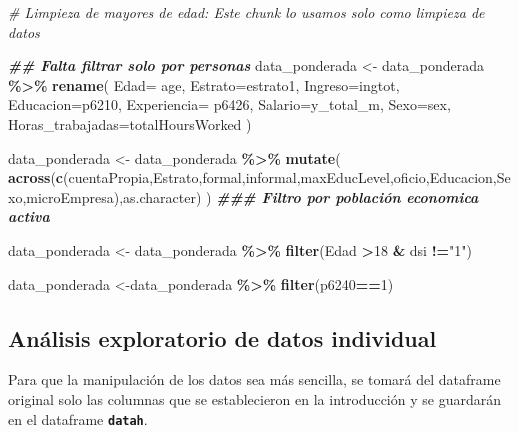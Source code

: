 \documentclass[
]{article}
\newenvironment{Shaded}{\begin{snugshade}}{\end{snugshade}}
\newcommand{\AttributeTok}[1]{\textcolor[rgb]{0.13,0.29,0.53}{#1}}
\newcommand{\CommentTok}[1]{\textcolor[rgb]{0.56,0.35,0.01}{\textit{#1}}}
\newcommand{\DecValTok}[1]{\textcolor[rgb]{0.00,0.00,0.81}{#1}}
\newcommand{\DocumentationTok}[1]{\textcolor[rgb]{0.56,0.35,0.01}{\textbf{\textit{#1}}}}
\newcommand{\FunctionTok}[1]{\textcolor[rgb]{0.13,0.29,0.53}{\textbf{#1}}}
\newcommand{\NormalTok}[1]{#1}
\newcommand{\OtherTok}[1]{\textcolor[rgb]{0.56,0.35,0.01}{#1}}
\newcommand{\SpecialCharTok}[1]{\textcolor[rgb]{0.81,0.36,0.00}{\textbf{#1}}}
\newcommand{\StringTok}[1]{\textcolor[rgb]{0.31,0.60,0.02}{#1}}
\begin{document}
\begin{Shaded}
\begin{Highlighting}[]
\CommentTok{\# Limpieza de mayores de edad: Este chunk lo usamos solo como limpieza de datos }


\DocumentationTok{\#\# Falta filtrar solo por personas }
\NormalTok{data\_ponderada }\OtherTok{\textless{}{-}}\NormalTok{ data\_ponderada }\SpecialCharTok{\%\textgreater{}\%}
    \FunctionTok{rename}\NormalTok{(}
      \AttributeTok{Edad=}\NormalTok{ age,}
      \AttributeTok{Estrato=}\NormalTok{estrato1,}
      \AttributeTok{Ingreso=}\NormalTok{ingtot,}
      \AttributeTok{Educacion=}\NormalTok{p6210,}
      \AttributeTok{Experiencia=}\NormalTok{ p6426,}
      \AttributeTok{Salario=}\NormalTok{y\_total\_m,}
      \AttributeTok{Sexo=}\NormalTok{sex,}
      \AttributeTok{Horas\_trabajadas=}\NormalTok{totalHoursWorked}
\NormalTok{  )  }

\NormalTok{data\_ponderada }\OtherTok{\textless{}{-}}\NormalTok{ data\_ponderada }\SpecialCharTok{\%\textgreater{}\%}
    \FunctionTok{mutate}\NormalTok{(}
      \FunctionTok{across}\NormalTok{(}\FunctionTok{c}\NormalTok{(cuentaPropia,Estrato,formal,informal,maxEducLevel,oficio,Educacion,Sexo,microEmpresa),as.character) }
\NormalTok{  )}
\DocumentationTok{\#\#\# Filtro por población economica activa}

\NormalTok{data\_ponderada }\OtherTok{\textless{}{-}}\NormalTok{ data\_ponderada }\SpecialCharTok{\%\textgreater{}\%}
  \FunctionTok{filter}\NormalTok{(Edad }\SpecialCharTok{\textgreater{}}\DecValTok{18} \SpecialCharTok{\&}\NormalTok{ dsi }\SpecialCharTok{!=}\StringTok{"1"}\NormalTok{) }


\NormalTok{data\_ponderada }\OtherTok{\textless{}{-}}\NormalTok{data\_ponderada }\SpecialCharTok{\%\textgreater{}\%}
  \FunctionTok{filter}\NormalTok{(p6240}\SpecialCharTok{==}\DecValTok{1}\NormalTok{)}
\end{Highlighting}
\end{Shaded}

\hypertarget{anuxe1lisis-exploratorio-de-datos-individual}{%
\subsection{Análisis exploratorio de datos
individual}\label{anuxe1lisis-exploratorio-de-datos-individual}}

Para que la manipulación de los datos sea más sencilla, se tomará del
dataframe original solo las columnas que se establecieron en la
introducción y se guardarán en el dataframe \textbf{\texttt{datah}}.
\end{document}
